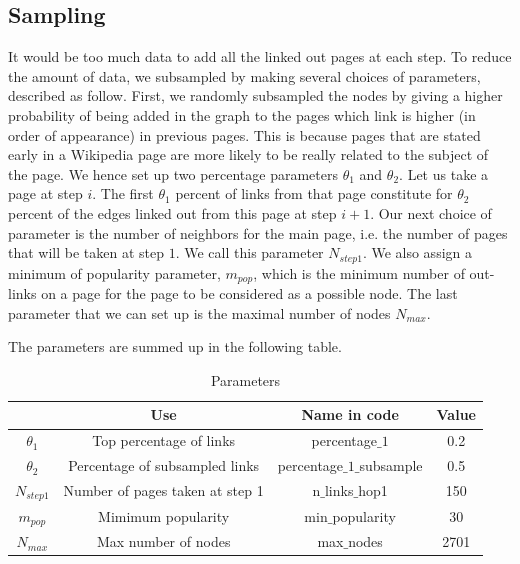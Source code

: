 \documentclass[conference]{IEEEtran}
\begin{document}
\subsection{Sampling}
It would be too much data to add all the linked out pages at each step.  To reduce the amount of data, we  subsampled by making several choices of parameters, described as follow. First, we randomly subsampled the nodes by giving a higher probability of being added in the graph to the pages which link is higher (in order of appearance) in previous pages. This is because pages that are stated early in a Wikipedia page are more likely to be really related to the subject of the page. We hence set up two percentage parameters $\theta_1$ and $\theta_2$. Let us take a page at step $i$. The first $\theta_1$ percent of links from that page constitute for $\theta_2$ percent of the edges linked out from this page at step $i+1$. Our next choice of parameter is the number of neighbors for the main page, i.e. the number of pages that will be taken at step $1$. We call this parameter $N_{step1}$. We also assign a minimum of popularity parameter, $m_{pop}$, which is the minimum number of out-links on a page for the page to be considered as a possible node. The last parameter that we can set up is the maximal number of nodes $N_{max}$. 

\medskip 

The parameters are summed up in the following table. 

\begin{table}[htbp]
\caption{Parameters}
\begin{center}
\begin{tabular}{|c|c|c|c|}
\hline
 & Use & Name in code & Value \\
\hline
$\theta_1$& Top  percentage of links  & percentage$\_1$ & 0.2 \\
\hline
$\theta_2$& Percentage of subsampled links &  percentage$\_1\_$subsample &  0.5\\
\hline
$N_{step1}$  &  Number of pages taken at step 1   & n$\_$links$\_$hop1  & 150  \\
\hline
$m_{pop}$  & Mimimum popularity  & min$\_$popularity &30 \\
\hline
$N_{max}$  &  Max number of nodes & max$\_$nodes&  2701 \\
\hline
\end{tabular}
\end{center}
\end{table}
\end{document}
